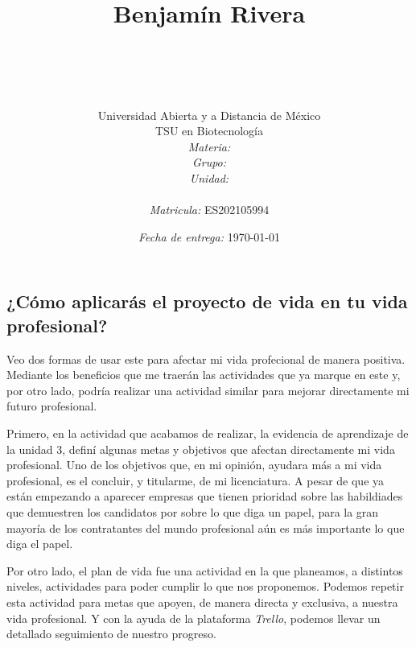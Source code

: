 \documentclass[12pt, a5paper]{article}
\title{
	\ \\ Benjam\'in Rivera \\
	\bf{\titulo}\\\ \\}
\author{
	{\Large Universidad Abierta y a Distancia de México} \\
	TSU en Biotecnolog\'ia \\
	\textit{Materia:} \materia \\
	\textit{Grupo:} \grupo \\
	\textit{Unidad:} \unidad \\
	\\
	\textit{Matricula:} ES202105994 }
\date{\textit{Fecha de entrega:} \today}
\begin{document}
\maketitle\newpage

\subsection*{¿Cómo aplicarás el proyecto de vida en tu vida profesional?}

\par Veo dos formas de usar este para afectar mi vida profecional de manera positiva. Mediante los beneficios que me traerán las actividades que ya marque en este y, por otro lado, podría realizar una actividad similar para mejorar directamente mi futuro profesional.

\par Primero, en la actividad que acabamos de realizar, la evidencia de aprendizaje de la unidad 3, definí algunas metas y objetivos que afectan directamente mi vida profesional. Uno de los objetivos que, en mi opinión, ayudara más a mi vida profesional, es el concluir, y titularme, de mi licenciatura. A pesar de que ya están empezando a aparecer empresas que tienen prioridad sobre las habildiades que demuestren los candidatos por sobre lo que diga un papel, para la gran mayoría de los contratantes del mundo profesional aún es más importante lo que diga el papel.

\par Por otro lado, el plan de vida fue una actividad en la que planeamos, a distintos niveles, actividades para poder cumplir lo que nos proponemos. Podemos repetir esta actividad para metas que apoyen, de manera directa y exclusiva, a nuestra vida profesional. Y con la ayuda de la plataforma \textit{Trello}, podemos llevar un detallado seguimiento de nuestro progreso.
\end{document}
